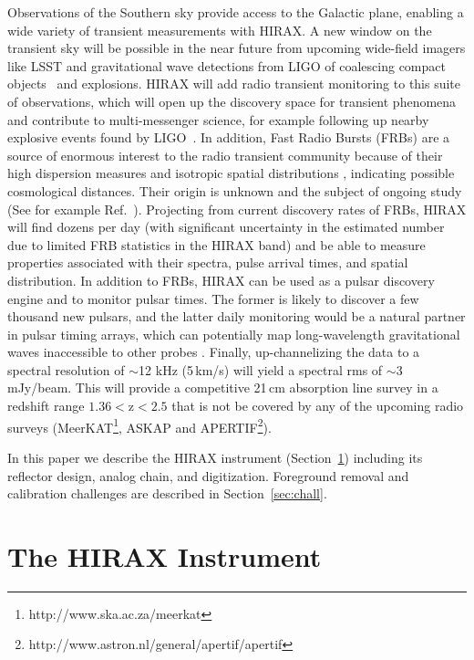 \documentclass[]{spie}  %
\begin{document}
Observations of the Southern sky provide access to the Galactic plane, enabling a wide variety of transient measurements with HIRAX. A new window on the transient sky will be possible in the near future from upcoming wide-field imagers like LSST and gravitational wave detections from LIGO of coalescing compact objects~\cite{PhysRevLett.116.241103} and explosions. HIRAX will add radio transient monitoring to this suite of observations, which will open up the discovery space for transient phenomena and contribute to multi-messenger science, for example following up nearby explosive events found by LIGO~\cite{2013MNRAS.430.2121P}. In addition, Fast Radio Bursts (FRBs) are a source of enormous interest to the radio transient community because of their high dispersion measures and isotropic spatial distributions \cite{2016MNRAS.460.1054C}, indicating possible cosmological distances. Their origin is unknown and the subject of ongoing study (See for example Ref.~\cite{2015Natur.528..523M}). Projecting from current discovery rates of FRBs, HIRAX will find dozens per day (with significant uncertainty in the estimated number due to limited FRB statistics in the HIRAX band) and be able to measure properties associated with their spectra, pulse arrival times, and spatial distribution. In addition to FRBs, HIRAX can be used as a pulsar discovery engine and to monitor pulsar times. The former is likely to discover a few thousand new pulsars, and the latter daily monitoring would be a natural partner in pulsar timing arrays, which can potentially map long-wavelength gravitational waves inaccessible to other probes \cite{2010CQGra..27h4013H}. Finally, up-channelizing the data to a spectral resolution of $\sim$12 kHz (5\,km/s) will yield a spectral rms of $\sim$3\,mJy/beam. This will provide a competitive 21\,cm absorption line survey in a redshift range $1.36<\mathrm{z}<2.5$ that is not be covered by any of the upcoming radio surveys (MeerKAT\footnote{http:\//\//www.ska.ac.za\//meerkat}, ASKAP\cite{2012SPIE.8444E..2AS} and APERTIF\footnote{http:\//\//www.astron.nl\//general\//apertif\//apertif}).
\newline 

In this paper we describe the HIRAX instrument (Section~\ref{sec:instru}) including its reflector design, analog chain, and digitization. Foreground removal and calibration challenges  are described in Section~\ref{sec:chall}.


\section{The HIRAX Instrument}
\label{sec:instru}
\end{document}
